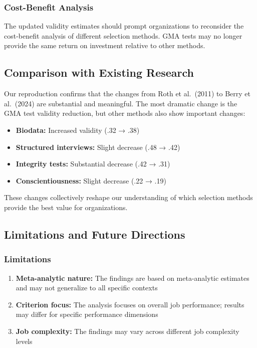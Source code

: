 \documentclass[
]{article}
\providecommand{\tightlist}{%
  \setlength{\itemsep}{0pt}\setlength{\parskip}{0pt}}
\begin{document}
\subsubsection{Cost-Benefit Analysis}\label{cost-benefit-analysis}

The updated validity estimates should prompt organizations to reconsider
the cost-benefit analysis of different selection methods. GMA tests may
no longer provide the same return on investment relative to other
methods.

\subsection{Comparison with Existing
Research}\label{comparison-with-existing-research-1}

Our reproduction confirms that the changes from Roth et al.~(2011) to
Berry et al.~(2024) are substantial and meaningful. The most dramatic
change is the GMA test validity reduction, but other methods also show
important changes:

\begin{itemize}
\tightlist
\item
  \textbf{Biodata:} Increased validity (.32 → .38)
\item
  \textbf{Structured interviews:} Slight decrease (.48 → .42)
\item
  \textbf{Integrity tests:} Substantial decrease (.42 → .31)
\item
  \textbf{Conscientiousness:} Slight decrease (.22 → .19)
\end{itemize}

These changes collectively reshape our understanding of which selection
methods provide the best value for organizations.

\subsection{Limitations and Future
Directions}\label{limitations-and-future-directions}

\subsubsection{Limitations}\label{limitations}

\begin{enumerate}
\def\labelenumi{\arabic{enumi}.}
\tightlist
\item
  \textbf{Meta-analytic nature:} The findings are based on meta-analytic
  estimates and may not generalize to all specific contexts
\item
  \textbf{Criterion focus:} The analysis focuses on overall job
  performance; results may differ for specific performance dimensions
\item
  \textbf{Job complexity:} The findings may vary across different job
  complexity levels
\end{enumerate}
\end{document}
